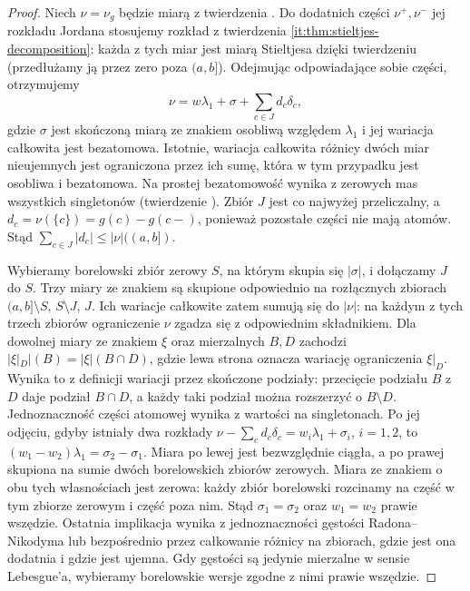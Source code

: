 \begin{proof}
Niech $\nu=\nu_g$ będzie miarą z twierdzenia
. Do dodatnich części
$\nu^+,\nu^-$ jej rozkładu Jordana stosujemy rozkład
z twierdzenia \ref{it:thm:stieltjes-decomposition}:
każda z tych miar jest miarą Stieltjesa dzięki twierdzeniu
 (przedłużamy ją przez
zero poza $(a,b]$). Odejmując odpowiadające sobie części,
otrzymujemy
\[
 \nu=w\lambda_1+\sigma+\sum_{c\in J}d_c\delta_c,
\]
gdzie $\sigma$ jest skończoną miarą ze znakiem osobliwą
względem $\lambda_1$ i jej wariacja całkowita jest bezatomowa.
Istotnie, wariacja całkowita różnicy dwóch miar nieujemnych jest
ograniczona przez ich sumę, która w tym przypadku
jest osobliwa i bezatomowa. Na prostej bezatomowość
wynika z zerowych mas wszystkich singletonów
(twierdzenie ).
Zbiór $J$ jest co najwyżej przeliczalny, a
$d_c=\nu(\{c\})=g(c)-g(c-)$, ponieważ pozostałe
części nie mają atomów. Stąd
$\sum_{c\in J}|d_c|\le|\nu|((a,b])$.

Wybieramy borelowski zbiór zerowy $S$, na którym skupia się
$|\sigma|$, i dołączamy $J$ do $S$. Trzy miary ze znakiem
są skupione odpowiednio na rozłącznych zbiorach
$(a,b]\setminus S$, $S\setminus J$, $J$.
Ich wariacje całkowite zatem sumują się do $|\nu|$:
na każdym z tych trzech zbiorów ograniczenie $\nu$
zgadza się z odpowiednim składnikiem. Dla dowolnej miary
ze znakiem $\xi$ oraz mierzalnych $B,D$ zachodzi
$\bigl|\xi|_D\bigr|(B)=|\xi|(B\cap D)$, gdzie lewa strona oznacza
wariację ograniczenia $\xi|_D$. Wynika to z definicji
wariacji przez skończone podziały: przecięcie podziału
$B$ z $D$ daje podział $B\cap D$, a każdy taki podział
można rozszerzyć o $B\setminus D$.
Jednoznaczność części atomowej wynika z wartości na
singletonach. Po jej odjęciu, gdyby istniały dwa rozkłady
$\nu-\sum_c d_c\delta_c=w_i\lambda_1+\sigma_i$,
$i=1,2$, to $(w_1-w_2)\lambda_1=\sigma_2-\sigma_1$.
Miara po lewej jest bezwzględnie ciągła, a po prawej
skupiona na sumie dwóch borelowskich zbiorów zerowych.
Miara ze znakiem o obu tych własnościach jest zerowa:
każdy zbiór borelowski rozcinamy na część w tym zbiorze
zerowym i część poza nim. Stąd $\sigma_1=\sigma_2$ oraz $w_1=w_2$ prawie
wszędzie. Ostatnia implikacja wynika z jednoznaczności
gęstości Radona--Nikodyma lub bezpośrednio przez
całkowanie różnicy na zbiorach, gdzie jest ona dodatnia
i gdzie jest ujemna. Gdy gęstości są jedynie mierzalne
w sensie Lebesgue'a, wybieramy borelowskie wersje
zgodne z nimi prawie wszędzie.


\end{proof}
